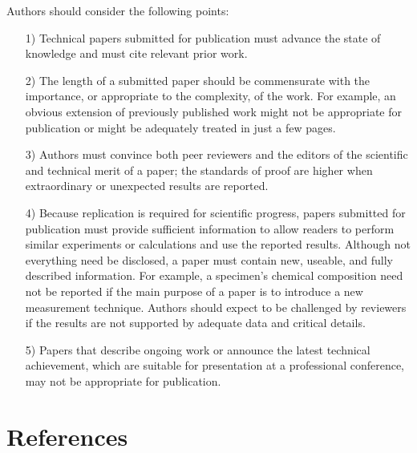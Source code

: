 \documentclass[journal]{IEEEtai}
\begin{document}
Authors should consider the following points:
\begin{enumerate}
\item[1)]Technical papers submitted for publication must advance the state of knowledge and must cite relevant prior work. 

\item[2)]The length of a submitted paper should be commensurate with the importance, or appropriate to the complexity, of the work. For example, an obvious extension of previously published work might not be appropriate for publication or might be adequately treated in just a few pages.

\item[3)]Authors must convince both peer reviewers and the editors of the scientific and technical merit of a paper; the standards of proof are higher when extraordinary or unexpected results are reported. 

\item[4)]Because replication is required for scientific progress, papers submitted for publication must provide sufficient information to allow readers to perform similar experiments or calculations and use the reported results. Although not everything need be disclosed, a paper must contain new, useable, and fully described information. For example, a specimen's chemical composition need not be reported if the main purpose of a paper is to introduce a new measurement technique. Authors should expect to be challenged by reviewers if the results are not supported by adequate data and critical details.

\item[5)]Papers that describe ongoing work or announce the latest technical achievement, which are suitable for presentation at a professional conference, may not be appropriate for publication.
\end{enumerate}

\section*{References}
\end{document}
